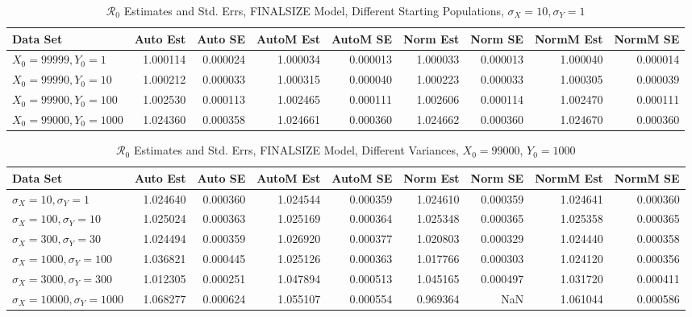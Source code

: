 \documentclass[12pt]{article}
\newcommand{\rr}{\ensuremath{\mathcal{R}_0}}
\begin{document}
\begin{table}[H]
	
	\caption{$\rr$ Estimates and Std. Errs, FINALSIZE Model,
		Different Starting Populations, 
		$\sigma_X = 10, \sigma_Y = 1$}
	\begin{footnotesize}
		\hskip -1.7cm
		\begin{tabular}{l|r|r|r|r|r|r|r|r}
			\hline
			Data Set & Auto Est & Auto SE & AutoM Est & AutoM SE & Norm Est & Norm SE & NormM Est & NormM SE\\
			\hline
			$X_0 = 99999, Y_0 = 1$ & 1.000114 & 0.000024 & 1.000034 & 0.000013 & 1.000033 & 0.000013 & 1.000040 & 0.000014\\
			\hline
			$X_0 = 99990, Y_0 = 10$ & 1.000212 & 0.000033 & 1.000315 & 0.000040 & 1.000223 & 0.000033 & 1.000305 & 0.000039\\
			\hline
			$X_0 = 99900, Y_0 = 100$ & 1.002530 & 0.000113 & 1.002465 & 0.000111 & 1.002606 & 0.000114 & 1.002470 & 0.000111\\
			\hline
			$X_0 = 99000, Y_0 = 1000$ & 1.024360 & 0.000358 & 1.024661 & 0.000360 & 1.024662 & 0.000360 & 1.024670 & 0.000360\\
			\hline
		\end{tabular}
	\end{footnotesize}
\end{table}

\begin{table}[H]
	
	\caption{$\rr$ Estimates and Std. Errs, FINALSIZE Model, 
		Different Variances, $X_0 = 99000$, $Y_0 = 1000$}
	\begin{footnotesize}
		\hskip -1.7cm
		\begin{tabular}{l|r|r|r|r|r|r|r|r}
			\hline
			Data Set & Auto Est & Auto SE & AutoM Est & AutoM SE & Norm Est & Norm SE & NormM Est & NormM SE\\
			\hline
			$\sigma_X = 10, \sigma_Y = 1$ & 1.024640 & 0.000360 & 1.024544 & 0.000359 & 1.024610 & 0.000359 & 1.024641 & 0.000360\\
			\hline
			$\sigma_X = 100, \sigma_Y = 10$ & 1.025024 & 0.000363 & 1.025169 & 0.000364 & 1.025348 & 0.000365 & 1.025358 & 0.000365\\
			\hline
			$\sigma_X = 300, \sigma_Y = 30$ & 1.024494 & 0.000359 & 1.026920 & 0.000377 & 1.020803 & 0.000329 & 1.024440 & 0.000358\\
			\hline
			$\sigma_X = 1000, \sigma_Y = 100$ & 1.036821 & 0.000445 & 1.025126 & 0.000363 & 1.017766 & 0.000303 & 1.024120 & 0.000356\\
			\hline
			$\sigma_X = 3000, \sigma_Y = 300$ & 1.012305 & 0.000251 & 1.047894 & 0.000513 & 1.045165 & 0.000497 & 1.031720 & 0.000411\\
			\hline
			$\sigma_X = 10000, \sigma_Y = 1000$ & 1.068277 & 0.000624 & 1.055107 & 0.000554 & 0.969364 & NaN & 1.061044 & 0.000586\\
			\hline
		\end{tabular}
	\end{footnotesize}
\end{table}
\end{document}
